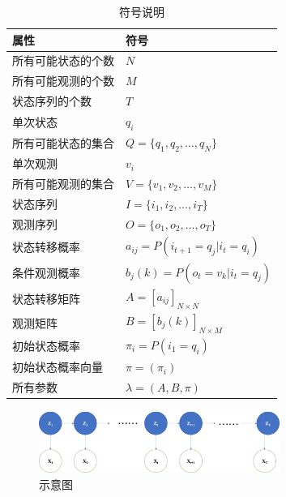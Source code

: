 \documentclass[a4paper,12pt]{ctexart}     %
\begin{document}
	\begin{table}[htbp]\songti{} 
		
		\begin{center}
			\renewcommand\arraystretch{1.5}         %
			\caption{符号说明 \label{tab:shuoming}} 
		{   %
			\begin{tabular}{ll}
				\toprule    
				属性 & 符号  \\    
				\midrule 
				所有可能状态的个数 &$ N $ \\
				所有可能观测的个数 & $ M $ \\ 
				状态序列的个数 & $ T $  \\   
				单次状态 & $q_i$ \\ 
				所有可能状态的集合 & $ Q = \{ q_1,q_2,\dots,q_N\} $  \\
				单次观测 & $ v_i $  \\ 
				所有可能观测的集合 & $ V = \{ v_1,v_2,\dots,v_M\} $  \\
				状态序列 & $ I = \{i_1,i_2,\dots,i_T\} $  \\
				观测序列 & $ O = \{ o_1,o_2,\dots,o_T\} $ \\
				状态转移概率 & $ a_{ij} = P(i_{t+1} = q_j | i_t = q_i) $ \\
				条件观测概率 & $ b_j(k) = P(o_t = v_k| i_t = q_j)$ \\ 
				状态转移矩阵 & $ A = [a_{ij} ]_{N \times N} $ \\
				观测矩阵 & $ B = [b_j(k)]_{N \times M} $ \\
				初始状态概率 & $ \pi_i = P(i_1 = q_i)$ \\
				初始状态概率向量 & $ \pi = (\pi_i) $ \\
				所有参数 & $ \lambda = (A,B,\pi) $\\  
				\bottomrule   
				
			\end{tabular} 
		}
		
		\end{center}
	\end{table}
	








		\begin{figure}[H] %
		\centering %
		\includegraphics[width=0.7\textwidth]{示意图.png} %
		\caption{示意图 \label{shiyitu}} %
		\end{figure}
	
\end{document}
